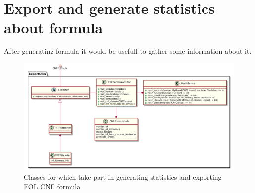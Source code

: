 \section{Export and generate statistics about formula}
\label{sec:GenerateStatisticsAboutFormula}

After generating formula it would be usefull to gather some information about it. 

\begin{figure}[h]
\begin{centering}
  \includegraphics[width=\textwidth]{logic-formula-generator/fol/cnf_formula_statistics.png}
  \caption{Classes for which take part in generating statistics and exporting FOL CNF formula}
  \label{pic:CNFFormulaInfo}
\end{centering}
\end{figure}
